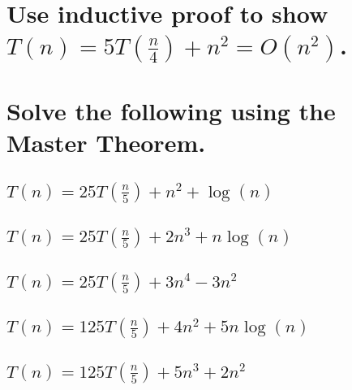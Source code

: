 \documentclass{article}
\begin{document}
\section{Use inductive proof to show \(T(n) = 5T(\frac{n}{4}) + n^2 = O(n^2)\).}

\section{Solve the following using the Master Theorem.}
    \subsection{\(T(n) = 25T(\frac{n}{5}) + n^2 + \log(n)\)}
    \subsection{\(T(n) = 25T(\frac{n}{5}) + 2n^3 + n \log(n)\)}
    \subsection{\(T(n) = 25T(\frac{n}{5}) + 3n^4 - 3n^2\)}
    \subsection{\(T(n) = 125T(\frac{n}{5}) + 4n^2 + 5n \log(n)\)}
    \subsection{\(T(n) = 125T(\frac{n}{5}) + 5n^3 + 2n^2\)}
\end{document}
